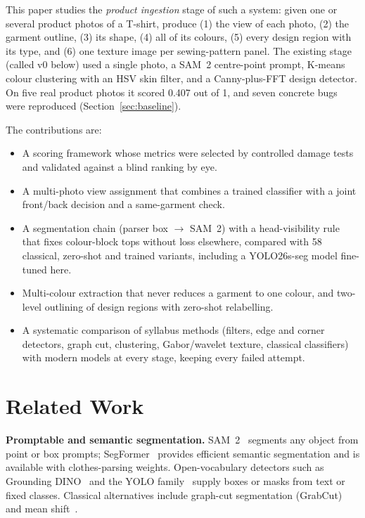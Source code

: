 \documentclass[conference]{IEEEtran}
\begin{document}
This paper studies the \emph{product ingestion} stage of such a system: given one or several product photos of a T-shirt, produce (1) the view of each photo, (2) the garment outline, (3) its shape, (4) all of its colours, (5) every design region with its type, and (6) one texture image per sewing-pattern panel. The existing stage (called v0 below) used a single photo, a SAM~2 centre-point prompt, K-means colour clustering with an HSV skin filter, and a Canny-plus-FFT design detector. On five real product photos it scored 0.407 out of 1, and seven concrete bugs were reproduced (Section~\ref{sec:baseline}).

The contributions are:
\begin{itemize}
\item A scoring framework whose metrics were selected by controlled damage tests and validated against a blind ranking by eye.
\item A multi-photo view assignment that combines a trained classifier with a joint front/back decision and a same-garment check.
\item A segmentation chain (parser box $\rightarrow$ SAM~2) with a head-visibility rule that fixes colour-block tops without loss elsewhere, compared with 58 classical, zero-shot and trained variants, including a YOLO26s-seg model fine-tuned here.
\item Multi-colour extraction that never reduces a garment to one colour, and two-level outlining of design regions with zero-shot relabelling.
\item A systematic comparison of syllabus methods (filters, edge and corner detectors, graph cut, clustering, Gabor/wavelet texture, classical classifiers) with modern models at every stage, keeping every failed attempt.
\end{itemize}

\section{Related Work}
\textbf{Promptable and semantic segmentation.} SAM~2~\cite{ravi2024sam2} segments any object from point or box prompts; SegFormer~\cite{xie2021segformer} provides efficient semantic segmentation and is available with clothes-parsing weights. Open-vocabulary detectors such as Grounding DINO~\cite{liu2024groundingdino} and the YOLO family~\cite{ultralytics} supply boxes or masks from text or fixed classes. Classical alternatives include graph-cut segmentation (GrabCut)~\cite{rother2004grabcut} and mean shift~\cite{comaniciu2002meanshift}.
\end{document}
